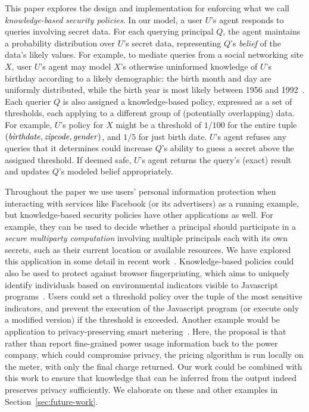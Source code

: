 This paper explores the design and implementation for enforcing what
we call \emph{knowledge-based security policies}.  In our model, a
user $U$'s agent responds to queries involving secret data.  For each
querying principal $Q$, the agent maintains a probability distribution
over $U$'s secret data, representing $Q$'s \emph{belief} of the data's
likely values.  For example, to mediate queries from a social
networking site $X$, user $U$'s agent may model $X$'s otherwise
uninformed knowledge of $U$'s birthday according to a likely
demographic: the birth month and day are uniformly distributed, while
the birth year is most likely between 1956 and
1992~\cite{facebook-demographics}.  Each querier $Q$ is also assigned
a knowledge-based policy, expressed as a set of thresholds, each
applying to a different group of (potentially overlapping) data.  For
example, $U$'s policy for $X$ might be a threshold of $1/100$ for the
entire tuple $(\mathit{birthdate},\mathit{zipcode},\mathit{gender})$, and $1/5$
for just birth date.  $U$'s agent refuses any queries that it
determines could increase $Q$'s ability to guess a secret above the
assigned threshold.  If deemed safe, $U$'s agent returns the query's
(exact) result and updates $Q$'s modeled belief appropriately.

Throughout the paper we use users' personal information protection
when interacting with services like Facebook (or its advertisers) as a
running example, but knowledge-based security policies have other
applications as well.  For example, they can be used to decide whether
a principal should participate in a \emph{secure multiparty
  computation} involving multiple principals each with its own
secrets, such as their current location or available resources.  We
have explored this application in some detail in recent
work~\cite{mardziel12smc}.  Knowledge-based policies could also be
used to protect against browser fingerprinting, which aims to uniquely
identify individuals based on environmental indicators visible to
Javascript programs~\cite{boda11fingerprint}. Users could set a
threshold policy over the tuple of the most sensitive indicators, and
prevent the execution of the Javascript program (or execute only a
modified version) if the threshold is exceeded.  Another example would
be application to privacy-preserving smart
metering~\cite{rial11smart}.  Here, the proposal is that rather than
report fine-grained power usage information back to the power company,
which could compromise privacy, the pricing algorithm is run locally
on the meter, with only the final charge returned.  Our work could be
combined with this work to ensure that knowledge that can be inferred
from the output indeed preserves privacy sufficiently.  We elaborate
on these and other examples in Section~\ref{sec:future-work}.

